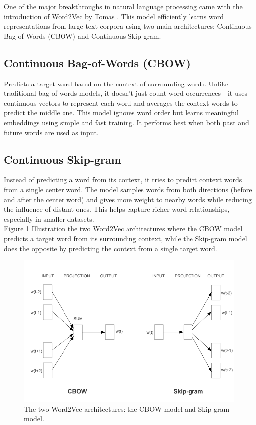 One of the major breakthroughs in natural language processing came with the introduction of Word2Vec by Tomas \citep{mikolov2013efficient}. This model efficiently learns word representations from large text corpora using two main architectures: Continuous Bag-of-Words (CBOW) and Continuous Skip-gram.

\subsection{Continuous Bag-of-Words (CBOW)} Predicts a target word based on the context of surrounding words. Unlike traditional bag-of-words models, it doesn’t just count word occurrences—it uses continuous vectors to represent each word and averages the context words to predict the middle one. This model ignores word order but learns meaningful embeddings using simple and fast training. It performs best when both past and future words are used as input.

\subsection{Continuous Skip-gram} Instead of predicting a word from its context, it tries to predict context words from a single center word. The model samples words from both directions (before and after the center word) and gives more weight to nearby words while reducing the influence of distant ones. This helps capture richer word relationships, especially in smaller datasets.\\
Figure \ref{word2vec-architectures} Illustration the two Word2Vec architectures where the CBOW model predicts a target word from its surrounding context, while the Skip-gram model does the opposite by predicting the context from a single target word.
\begin{figure}[H]
	\centering
	\includegraphics[width=0.6\linewidth]{Figures/emb.png}
	\caption{The two Word2Vec architectures: the CBOW model  and Skip-gram model.}
	\label{word2vec-architectures}
\end{figure}

